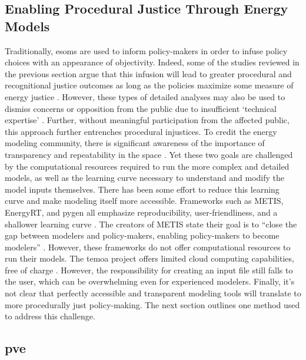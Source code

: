 \subsection{Enabling Procedural Justice Through Energy Models}

Traditionally, \acp{esom} are used to inform policy-makers \cite{li_open_2020}
in order to infuse policy choices with an appearance of objectivity. Indeed,
some of the studies reviewed in the previous section argue that this infusion
will lead to greater procedural and recognitional justice outcomes as long as
the policies maximize some measure of energy justice
\cite{chapman_prioritizing_2018, heffron_resolving_2015}. However, these types
of detailed analyses may also be used to dismiss concerns or opposition from the
public due to insufficient `technical expertise' \cite{johnson_dakota_2021}.
Further, without meaningful participation from the affected public, this
approach further entrenches procedural injustices. To credit the energy
modeling community, there is significant awareness of the importance of
transparency and repeatability in the space \cite{decarolis_case_2012,
pfenninger_energy_2014, pfenninger_openmod_nodate, forster_open_2022,
hilpert_open_2018}. Yet these two goals are challenged by the computational
resources required to run the more complex and detailed models, as well as the
learning curve necessary to understand and modify the model inputs themselves.
There has been some effort to reduce this learning curve and make modeling
itself more accessible. Frameworks such as METIS, EnergyRT, and \ac{pygen} all
emphasize reproducibility, user-friendliness, and a shallower learning curve
\cite{sakellaris_metis_2018, lugovoy_energyrt_2022, dotson_python_2021}. The
creators of METIS state their goal is to ``close the gap between modelers and
policy-makers, enabling policy-makers to become modelers''
\cite{sakellaris_metis_2018}. However, these frameworks do not offer
computational resources to run their models. The \ac{temoa} project offers
limited cloud computing capabilities, free of charge
\cite{temoa_project_temoa_2023}. However, the responsibility for creating an
input file still falls to the user, which can be overwhelming even for
experienced modelers. Finally, it's not clear that perfectly accessible and
transparent modeling tools will translate to more procedurally just
policy-making. The next section outlines one method used to address this
challenge.

\subsection{\Acl{pve}}

